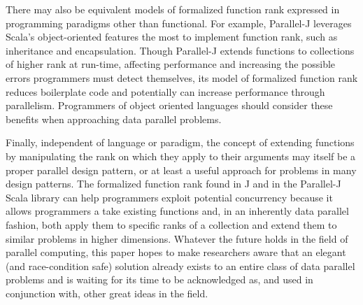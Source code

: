 There may also be equivalent models of formalized function rank 
expressed in programming paradigms other than functional. 
For example, Parallel-J leverages Scala's object-oriented features the most to implement function rank, 
such as inheritance and encapsulation. 
Though Parallel-J extends functions to collections of higher rank at run-time, 
affecting performance and increasing the possible errors programmers must detect themselves, 
its model of formalized function rank reduces boilerplate code and 
potentially can increase performance through parallelism. 
Programmers of object oriented languages should consider these benefits 
when approaching data parallel problems.

Finally, independent of language or paradigm, 
the concept of extending functions by manipulating the rank on which they apply to their arguments 
may itself be a proper parallel design pattern, 
or at least a useful approach for problems in many design patterns.
The formalized function rank found in J and in the Parallel-J Scala library 
can help programmers exploit potential concurrency 
because it allows programmers a take existing functions and, in an inherently data parallel fashion, 
both apply them to specific ranks of a collection and 
extend them to similar problems in higher dimensions. 
Whatever the future holds in the field of parallel computing, 
this paper hopes to make researchers aware that an elegant (and race-condition safe) solution 
already exists to an entire class of data parallel problems 
and is waiting for its time to be acknowledged as, and used in conjunction with, other great ideas in the field.
